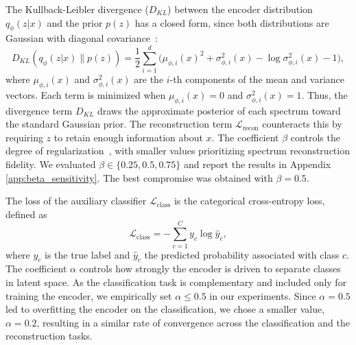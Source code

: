 \documentclass[12pt]{article}
\theoremstyle{paper}
\begin{document}
The Kullback-Leibler divergence ($D_{KL}$) between the encoder distribution $q_\phi(z|x)$ and the prior $p(z)$ has a closed form, since both distributions are Gaussian with diagonal covariance~\cite{higgins2017betavae, Asperti2020}:
\begin{equation}
D_{KL}(q_\phi(z|x) \| p(z)) = \frac{1}{2} \sum_{i=1}^{d} \Big( \mu_{\phi, i}(x)^2 + \sigma_{\phi, i}^2(x) - \log\sigma_{\phi, i}^2(x) - 1 \Big),
\end{equation} where $\mu_{\phi, i}(x)$ and $\sigma_{\phi, i}^2(x)$ are the $i$-th components of the mean and variance vectors. Each term is minimized when $\mu_{\phi, i}(x) = 0$ and $\sigma_{\phi, i}^2(x) = 1$. Thus, the divergence term $D_{KL}$ draws the approximate posterior of each spectrum toward the standard Gaussian prior. The reconstruction term $\mathcal{L}_{\text{recon}}$ counteracts this by requiring $z$ to retain enough information about $x$. The coefficient $\beta$ controls the degree of regularization~\cite{higgins2017betavae}, with smaller values prioritizing spectrum reconstruction fidelity. We evaluated $\beta \in \{0.25, 0.5, 0.75\}$ and report the results in Appendix \ref{app:beta_sensitivity}. The best compromise was obtained with $\beta = 0.5$.




The loss of the auxiliary classifier $\mathcal{L}_{\text{class}}$ is the categorical cross-entropy loss, defined as 
\begin{equation}
\mathcal{L}_{\text{class}} = - \sum_{c=1}^{C} y_c \log \hat{y}_c,
\end{equation} where $y_c$ is the true label and $\hat{y}_c$ the predicted probability associated with class $c$. The coefficient $\alpha$ controls how strongly the encoder is driven to separate classes in latent space. As the classification task is complementary and included only for training the encoder, we empirically set $\alpha \le 0.5$ in our experiments. Since $\alpha = 0.5$ led to overfitting the encoder on the classification, we chose a smaller value, $\alpha = 0.2$, resulting in a similar rate of convergence across the classification and the reconstruction tasks.
\end{document}

